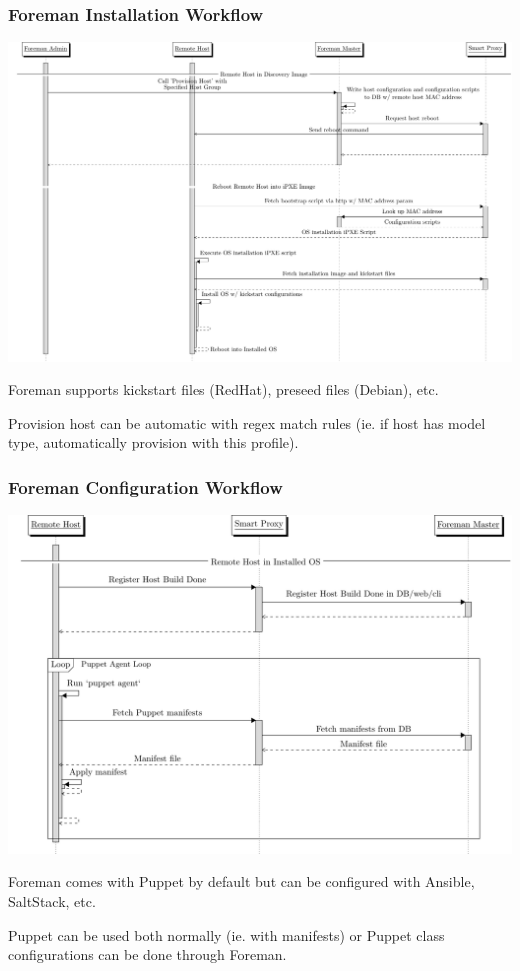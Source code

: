 \documentclass{beamer}
\begin{document}
\begin{frame}[fragile]
	\frametitle{Foreman Installation Workflow}

	\centering
	\includegraphics[width=\textwidth,height=\textheight-35mm,keepaspectratio]{installation_sd}

	\tiny Foreman supports kickstart files (RedHat), preseed files (Debian), etc.
	\vspace{.5cm}

	\normalsize Provision host can be automatic with regex match rules (ie. if host has model type, automatically provision with this profile).
\end{frame}

\begin{frame}[fragile]
	\frametitle{Foreman Configuration Workflow}

	\centering
	\includegraphics[width=\textwidth,height=\textheight-35mm,keepaspectratio]{configuration_sd}

	\tiny Foreman comes with Puppet by default but can be configured with Ansible, SaltStack, etc.
	\vspace{.5cm}

	\normalsize Puppet can be used both normally (ie. with manifests) or Puppet class configurations can be done through Foreman.
\end{frame}
\end{document}

